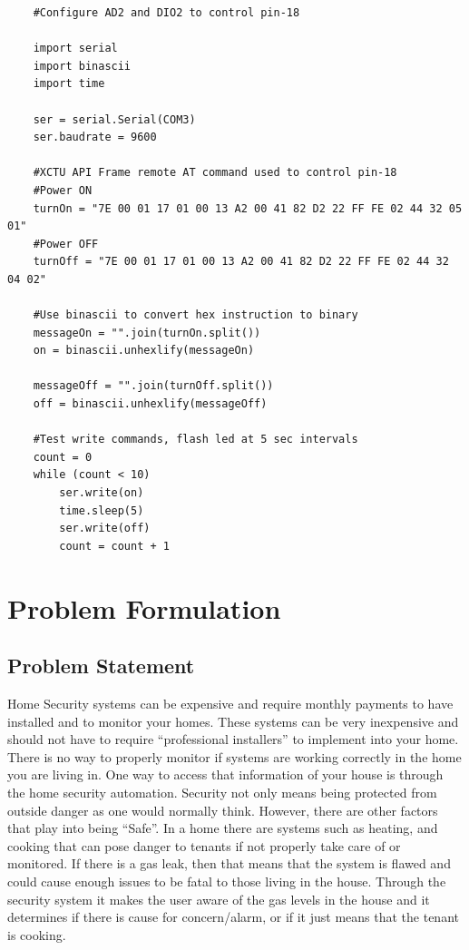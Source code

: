 \documentclass[a4paper,11pt]{report}
\begin{document}
	\begin{lstlisting}
	#Configure AD2 and DIO2 to control pin-18
	
	import serial
	import binascii
	import time
	
	ser = serial.Serial(COM3)
	ser.baudrate = 9600
	
	#XCTU API Frame remote AT command used to control pin-18
	#Power ON
	turnOn = "7E 00 01 17 01 00 13 A2 00 41 82 D2 22 FF FE 02 44 32 05 01"
	#Power OFF
	turnOff = "7E 00 01 17 01 00 13 A2 00 41 82 D2 22 FF FE 02 44 32 04 02"
	
	#Use binascii to convert hex instruction to binary
	messageOn = "".join(turnOn.split()) 
	on = binascii.unhexlify(messageOn)
	
	messageOff = "".join(turnOff.split())
	off = binascii.unhexlify(messageOff)
	
	#Test write commands, flash led at 5 sec intervals
	count = 0
	while (count < 10)
		ser.write(on)
		time.sleep(5)
		ser.write(off)
		count = count + 1
	\end{lstlisting}

		
	\section{Problem Formulation}
		\subsection{Problem Statement}
		\par Home Security systems can be expensive and require monthly payments to have installed and to monitor your homes. These systems can be very inexpensive and should not have to require “professional installers” to implement into your home. There is no way to properly monitor if systems are working correctly in the home you are living in. One way to access that information of your house is through the home security automation. Security not only means being protected from outside danger as one would normally think. However, there are other factors that play into being “Safe”. In a home there are systems such as heating, and cooking that can pose danger to tenants if not properly take care of or monitored. If there is a gas leak, then that means that the system is flawed and could cause enough issues to be fatal to those living in the house. Through the security system it makes the user aware of the gas levels in the house and it determines if there is cause for concern/alarm, or if it just means that the tenant is cooking. 
	
	\listoffigures
			
		
		
			
\end{document}
